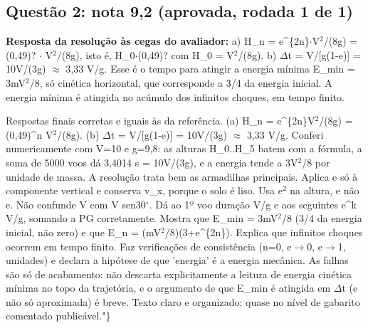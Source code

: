 \documentclass{article}%
\begin{document}
\subsection*{Questão 2: nota 9,2 (aprovada, rodada 1 de 1)}%
\textbf{Resposta da resolução às cegas do avaliador:} a) H\_n = e\^{}\{2n\}$\cdot$V$^2$/(8g) = (0,49)? $\cdot$ V$^2$/(8g), isto é, H\_0$\cdot$(0,49)? com H\_0 = V$^2$/(8g).\newline%
\newline%
b) $\Delta$t = V/{[}g(1-e){]} = 10V/(3g) $\approx$ 3,33 V/g. Esse é o tempo para atingir a energia mínima E\_min = 3mV$^2$/8, só cinética horizontal, que corresponde a 3/4 da energia inicial. A energia mínima é atingida no acúmulo dos infinitos choques, em tempo finito.\par %
Respostas finais corretas e iguais às da referência. (a) H\_n = e\^{}\{2n\}V$^2$/(8g) = (0,49)\^{}n V$^2$/(8g). (b) $\Delta$t = V/{[}g(1-e){]} = 10V/(3g) $\approx$ 3,33 V/g. Conferi numericamente com V=10 e g=9,8: as alturas H\_0..H\_5 batem com a fórmula, a soma de 5000 voos dá 3,4014 s = 10V/(3g), e a energia tende a 3V$^2$/8 por unidade de massa. A resolução trata bem as armadilhas principais. Aplica e só à componente vertical e conserva v\_x, porque o solo é liso. Usa e$^2$ na altura, e não e. Não confunde V com V sen30$^\circ$. Dá ao 1º voo duração V/g e aos seguintes e\^{}k V/g, somando a PG corretamente. Mostra que E\_min = 3mV$^2$/8 (3/4 da energia inicial, não zero) e que E\_n = (mV$^2$/8)(3+e\^{}\{2n\}). Explica que infinitos choques ocorrem em tempo finito. Faz verificações de consistência (n=0, e$\to$0, e$\to$1, unidades) e declara a hipótese de que 'energia' é a energia mecânica. As falhas são só de acabamento: não descarta explicitamente a leitura de energia cinética mínima no topo da trajetória, e o argumento de que E\_min é atingida em $\Delta$t (e não só aproximada) é breve. Texto claro e organizado; quase no nível de gabarito comentado publicável."\}%
\end{document}
